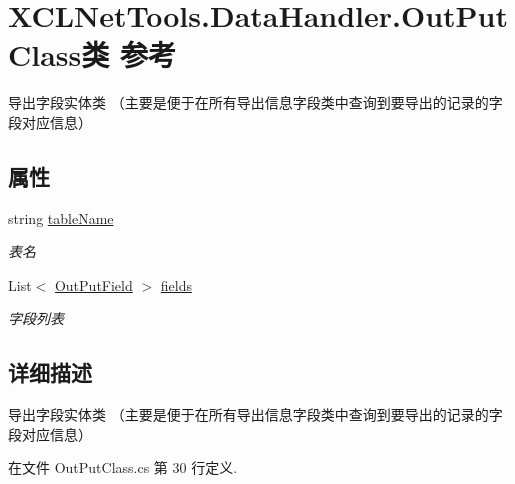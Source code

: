 \hypertarget{class_x_c_l_net_tools_1_1_data_handler_1_1_out_put_class}{\section{X\-C\-L\-Net\-Tools.\-Data\-Handler.\-Out\-Put\-Class类 参考}
\label{class_x_c_l_net_tools_1_1_data_handler_1_1_out_put_class}
}


导出字段实体类 （主要是便于在所有导出信息字段类中查询到要导出的记录的字段对应信息）  


\subsection*{属性}
\begin{DoxyCompactItemize}
\item 
string \hyperlink{class_x_c_l_net_tools_1_1_data_handler_1_1_out_put_class_aef1df865588230b66b506058970e8894}{table\-Name}
\begin{DoxyCompactList}\small\item\em 表名 \end{DoxyCompactList}\item 
List$<$ \hyperlink{class_x_c_l_net_tools_1_1_data_handler_1_1_out_put_field}{Out\-Put\-Field} $>$ \hyperlink{class_x_c_l_net_tools_1_1_data_handler_1_1_out_put_class_aaa38718d249736e2070ab87f10a829ae}{fields}
\begin{DoxyCompactList}\small\item\em 字段列表 \end{DoxyCompactList}\end{DoxyCompactItemize}


\subsection{详细描述}
导出字段实体类 （主要是便于在所有导出信息字段类中查询到要导出的记录的字段对应信息） 



在文件 Out\-Put\-Class.\-cs 第 30 行定义.



